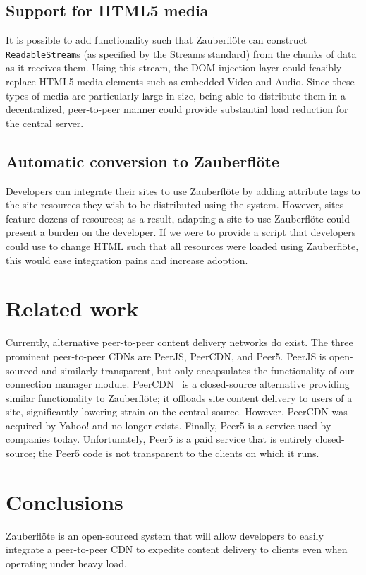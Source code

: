 \documentclass[letterpaper,twocolumn,10pt]{article}
\newcommand{\zbf}{Zauberfl\"{o}te\xspace}
\begin{document}
\subsection{Support for HTML5 media}
It is possible to add functionality such that \zbf can construct
\texttt{ReadableStream}s (as specified by the Streams standard)
from the chunks of data as it receives them. Using this stream, the DOM injection
layer could feasibly replace HTML5 media elements such as embedded Video and Audio.
Since these types of media are particularly large in size, being able to distribute
them in a decentralized, peer-to-peer manner could provide substantial load
reduction for the central server.

\subsection{Automatic conversion to \zbf}
Developers can integrate their sites to use \zbf by adding attribute tags to
the site resources they wish to be distributed using the system. However, sites feature
dozens of resources; as a result, adapting a site to use \zbf could present a
burden on the developer. If we were to provide a script that developers could use
to change HTML such that all resources were loaded using \zbf, this would ease
integration pains and increase adoption.

\section{Related work}

Currently, alternative peer-to-peer content delivery networks do exist. The three
prominent peer-to-peer CDNs are PeerJS, PeerCDN, and Peer5. PeerJS is open-sourced
and similarly transparent, but only encapsulates the functionality of our connection manager
module. PeerCDN~\cite{peercdn} is a closed-source alternative providing  similar
functionality to \zbf; it offloads site content delivery to users of a site,
significantly lowering strain on the central source. However, PeerCDN was acquired by
Yahoo! and no longer exists. Finally, Peer5 is a service used by companies today.
Unfortunately, Peer5 is a paid service that is entirely closed-source; the Peer5 code is
not transparent to the clients on which it runs.

\section{Conclusions}

\zbf is an open-sourced system
that will allow developers to easily integrate a peer-to-peer CDN to expedite
content delivery to clients even when operating under heavy load.



{\footnotesize 
}
\end{document}
